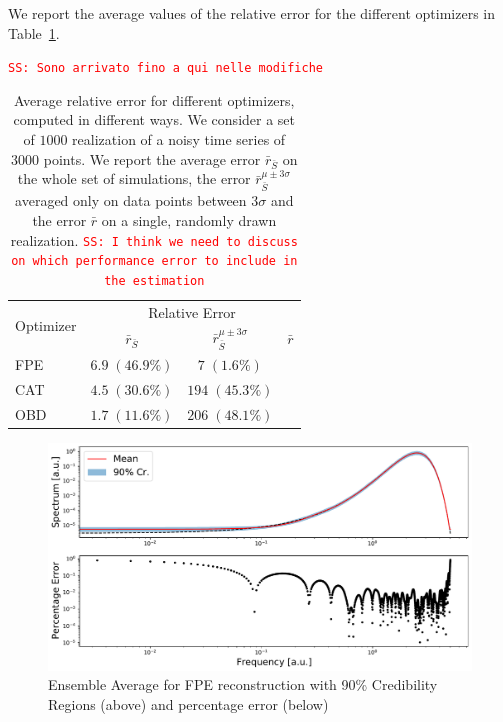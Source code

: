 \documentclass[twocolumn,showpacs,preprintnumbers,nofootinbib,prd,
superscriptaddress,10pt]{revtex4-1}
\newcommand{\sschmidt}[1]{{\textcolor{red}{\texttt{SS: #1}} }}
\begin{document}
We report the average values of the relative error for the different optimizers in Table~\ref{tab:relative_errors}.

\sschmidt{Sono arrivato fino a qui nelle modifiche}
\begin{table}
	\caption{Average relative error for different optimizers, computed in different ways. We consider a set of $1000$ realization of a noisy time series of $3000$ points.
	We report the average error  $\bar{r}_{\bar{S}}$ on the whole set of simulations, the error $\bar{r}_{\bar S}^{\mu \pm 3\sigma} $ averaged only on data points between $3\sigma$ and the error $\bar{r}$ on a single, randomly drawn realization.
	\sschmidt{I think we need to discuss on which performance error to include in the estimation}
	}
	\label{tab:relative_errors}
	\def\arraystretch{1.5}
	\begin{ruledtabular}
		\begin{tabular}{ l c c c }
			\multirow{2}{*}{Optimizer}& \multicolumn{3}{c}{Relative Error}\\
			& $\bar{r}_{\bar{S}}$	& $\bar{r}_{\bar S}^{\mu \pm 3\sigma} $ & $\bar{r}$\\
			\hline \hline
			FPE 			& $6.9 \; (46.9\%)$	& $7 \; (1.6\%)$ & \\ 
			\hline
			CAT 			& $4.5 \; (30.6\%)$	& $194 \; (45.3\%)$ & \\
			\hline
			OBD 				& $1.7 \; (11.6\%)$	& $206 \; (48.1\%)$ & \\
		\end{tabular}
	\end{ruledtabular}
\end{table}


\begin{figure}[H]
	\centering
	\includegraphics[width = \linewidth]{Images/NormalPSD/FPEpsdAndResiduals.pdf}
	\caption{Ensemble Average for FPE reconstruction with 90\% Credibility Regions (above) and percentage error (below)}
	\label{fig:FPEmean}
\end{figure}
\end{document}
